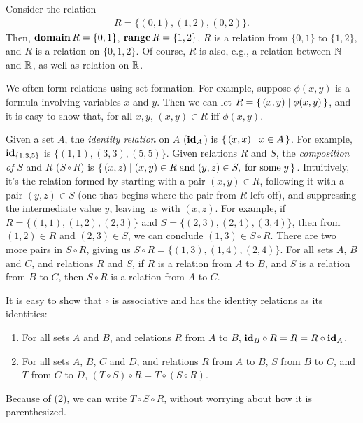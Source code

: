 Consider the relation
\begin{gather*}
R=\{(0,1),(1,2),(0,2)\} .
\end{gather*}
Then, $\mathbf{domain}\,R=\{0,1\}$, $\mathbf{range}\,R=\{1,2\}$, $R$ is a relation from
$\{0,1\}$ to $\{1,2\}$, and $R$ is a relation on $\{0,1,2\}$.
Of course, $R$ is also, e.g., a relation between $\mathbb{N}$ and $\mathbb{R}$,
as well as relation on $\mathbb{R}$.

We often form relations using set formation.
%
%
%
%
For example, suppose
$\phi(x,y)$ is a formula involving variables $x$ and $y$.  Then we can
let $R=\{ \, (x,y) \mid \phi(x,y) \, \}$, and it is easy to show that, for all
$x, y$, $(x,y)\in R$ iff $\phi(x,y)$.

Given a set $A$, the \emph{identity relation}
%
%
on $A$ ($\mathbf{id}_A$)
%
%
is $\{ \, (x,x) \mid x\in A \, \}$.  For example, $\mathbf{id}_{\{1,3,5\}}$ is
$\{(1,1),(3,3),(5,5)\}$.
Given relations $R$ and $S$, the
\emph{composition of}
%
%
%
$S$ and $R$ ($S\circ R$)
%
%
is $\{ \, (x,z) \mid (x,y)\in R\;\allowbreak\mbox{and}\allowbreak\; (y,z)\in S,\;\allowbreak\mbox{for some}\allowbreak\; y \, \}$.
Intuitively, it's the relation formed by starting with a pair
$(x,y)\in R$, following it with a pair $(y,z)\in S$ (one that begins
where the pair from $R$ left off), and suppressing the intermediate
value $y$, leaving us with $(x,z)$.  For example, if $R=\{(1, 1), (1,
2), (2, 3)\}$ and $S=\{(2, 3), (2, 4), (3, 4)\}$, then from
$(1,2)\in R$ and $(2,3)\in S$, we can conclude $(1,3)\in S\circ R$.
There are two more pairs in $S\circ R$, giving us
$S\circ R=\{(1, 3), (1, 4), (2, 4)\}$.  For all sets $A$, $B$ and $C$,
and relations $R$ and $S$, if $R$ is a relation from $A$ to $B$,
and $S$ is a relation from $B$ to $C$, then $S\circ R$ is a relation
from $A$ to $C$.

It is easy to show that $\circ$ is associative
%
%
%
%
and has the identity relations as its identities:
\begin{enumerate}[\quad(1)]
\item For all sets $A$ and $B$, and relations $R$ from $A$ to $B$,
$\mathbf{id}_B\circ R = R = R\circ\mathbf{id}_A$.

\item For all sets $A$, $B$, $C$ and $D$, and relations
$R$ from $A$ to $B$, $S$ from $B$ to $C$, and $T$ from $C$ to $D$,
$(T\circ S)\circ R = T\circ (S\circ R)$.
\end{enumerate}
Because of (2), we can write $T\circ S\circ R$, without worrying about
how it is parenthesized.

